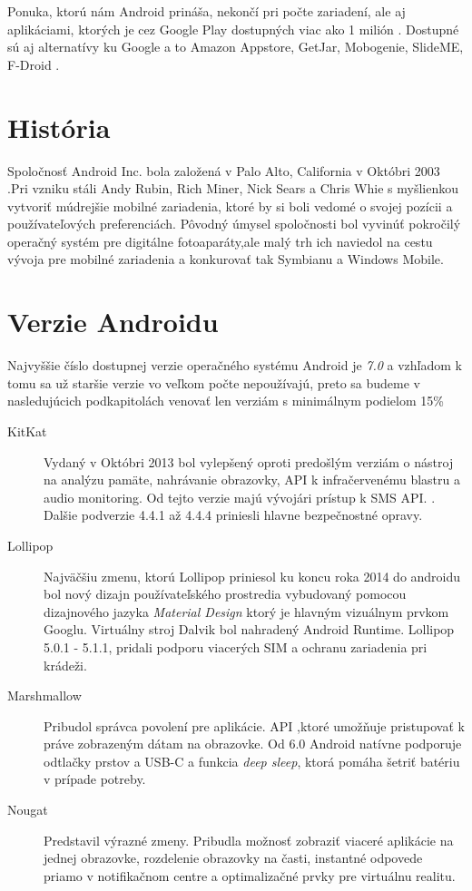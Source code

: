 Ponuka, ktorú nám Android prináša, nekončí pri počte zariadení, ale aj aplikáciami, ktorých je cez Google Play dostupných viac ako 1 milión \cite{android}. Dostupné sú aj alternatívy ku Google a to Amazon Appstore, GetJar, Mobogenie, SlideME, F-Droid \cite{playstore_alt}.

\section{História}

Spoločnosť Android Inc. bola založená v Palo Alto, California v Októbri 2003 \cite{history_android}.Pri vzniku stáli Andy Rubin, Rich Miner, Nick Sears a Chris Whie s myšlienkou vytvoriť múdrejšie mobilné zariadenia, ktoré by si boli vedomé o svojej pozícii a používateľových preferenciách. Pôvodný úmysel spoločnosti bol vyvinúť pokročilý operačný systém pre digitálne fotoaparáty,ale  malý trh ich naviedol na cestu vývoja pre mobilné zariadenia a konkurovať tak Symbianu a Windows Mobile. \cite{history_cameras}


\section{Verzie Androidu}
Najvyššie číslo dostupnej verzie operačného systému Android je \textit{7.0} a vzhľadom k tomu sa už staršie verzie vo veľkom počte nepoužívajú, preto sa budeme v nasledujúcich podkapitolách venovať len verziám s minimálnym podielom 15\%

\begin{description}
\item[KitKat] Vydaný v Októbri 2013 bol vylepšený oproti predošlým verziám  o nástroj na analýzu pamäte, nahrávanie obrazovky, API k infračervenému blastru a audio monitoring. Od tejto verzie majú vývojári prístup k SMS API. \cite{versions} . Dalšie podverzie 4.4.1 až 4.4.4 priniesli hlavne bezpečnostné opravy.


\item[Lollipop] Najväčšiu zmenu, ktorú Lollipop priniesol ku koncu roka 2014 do androidu  bol nový dizajn používateľského prostredia vybudovaný pomocou dizajnového jazyka \textit{Material Design} ktorý je hlavným vizuálnym prvkom Googlu. Virtuálny stroj Dalvik bol nahradený Android Runtime\cite{dalvik}. Lollipop 5.0.1 - 5.1.1, pridali podporu viacerých SIM a  ochranu zariadenia pri krádeži.


\item[Marshmallow] Pribudol správca povolení pre aplikácie. API ,ktoré umožňuje pristupovať k práve zobrazeným dátam na obrazovke. Od 6.0 Android natívne podporuje odtlačky prstov a USB-C a funkcia \textit{deep sleep}, ktorá pomáha šetriť batériu v prípade potreby.


\item[Nougat] Predstavil výrazné zmeny. Pribudla možnosť zobraziť viaceré aplikácie na jednej obrazovke, rozdelenie obrazovky na časti, instantné odpovede priamo v notifikačnom centre a optimalizačné prvky pre virtuálnu realitu.

\end{description}

